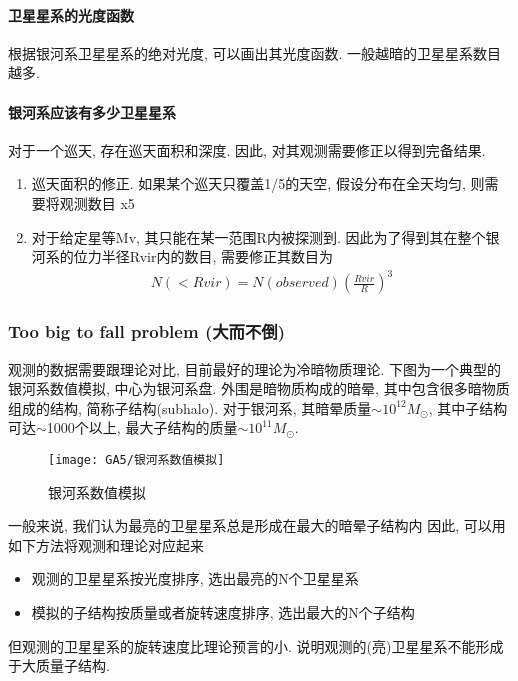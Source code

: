 \paragraph{卫星星系的光度函数}
根据银河系卫星星系的绝对光度, 可以画出其光度函数. 一般越暗的卫星星系数目越多. 

\paragraph{银河系应该有多少卫星星系}
对于一个巡天, 存在巡天面积和深度. 因此, 对其观测需要修正以得到完备结果. 
\begin{enumerate}\small
    \item 巡天面积的修正. 如果某个巡天只覆盖1/5的天空, 假设分布在全天均匀, 则需要将观测数目 x5
    \item 对于给定星等Mv, 其只能在某一范围R内被探测到. 因此为了得到其在整个银河系的位力半径Rvir内的数目, 需要修正其数目为
    \begin{align*}
        N(<Rvir)=N(observed)\left( \frac{Rvir}{R} \right)^3
    \end{align*}
\end{enumerate}

\subsubsection{Too big to fall problem (大而不倒)}
观测的数据需要跟理论对比, 目前最好的理论为冷暗物质理论. 
下图为一个典型的银河系数值模拟, 中心为银河系盘. 外围是暗物质构成的暗晕, 其中包含很多暗物质组成的结构, 简称子结构(subhalo). 对于银河系, 其暗晕质量$\sim 10 ^{12}M_{\odot}$, 其中子结构可达$\sim $1000个以上, 最大子结构的质量$\sim 10 ^{11}M_{\odot}$. 

\begin{figure}[!htb]
    \centering
    \texttt{[image: GA5/银河系数值模拟]}
    \caption{银河系数值模拟}
\end{figure}

一般来说, 我们认为最亮的卫星星系总是形成在最大的暗晕子结构内
因此, 可以用如下方法将观测和理论对应起来
\begin{itemize}\small
    \item 观测的卫星星系按光度排序, 选出最亮的N个卫星星系
    \item 模拟的子结构按质量或者旋转速度排序, 选出最大的N个子结构
\end{itemize}

但观测的卫星星系的旋转速度比理论预言的小. 说明观测的(亮)卫星星系不能形成于大质量子结构. 


